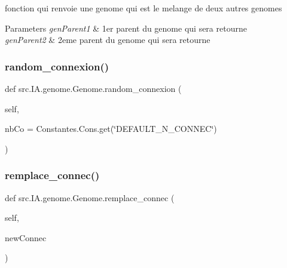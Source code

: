fonction qui renvoie une genome qui est le melange de deux autres genomes 


\begin{DoxyParams}{Parameters}
{\em gen\+Parent1} & 1er parent du genome qui sera retourne \\
\hline
{\em gen\+Parent2} & 2eme parent du genome qui sera retourne \\
\hline
\end{DoxyParams}
\mbox{\label{classsrc_1_1_i_a_1_1genome_1_1_genome_a361c26903fa6bc978955402580c8d1b2}} 
\subsubsection{\texorpdfstring{random\+\_\+connexion()}{random\_connexion()}}
{\footnotesize\ttfamily def src.\+I\+A.\+genome.\+Genome.\+random\+\_\+connexion (\begin{DoxyParamCaption}\item[{}]{self,  }\item[{}]{nb\+Co = {\ttfamily Constantes.Cons.get(\char`\"{}DEFAULT\+\_\+N\+\_\+CONNEC\char`\"{})} }\end{DoxyParamCaption})}

\mbox{\label{classsrc_1_1_i_a_1_1genome_1_1_genome_aed3a26c1418ec0b34d654c6f9464b709}} 
\subsubsection{\texorpdfstring{remplace\+\_\+connec()}{remplace\_connec()}}
{\footnotesize\ttfamily def src.\+I\+A.\+genome.\+Genome.\+remplace\+\_\+connec (\begin{DoxyParamCaption}\item[{}]{self,  }\item[{}]{new\+Connec }\end{DoxyParamCaption})}



